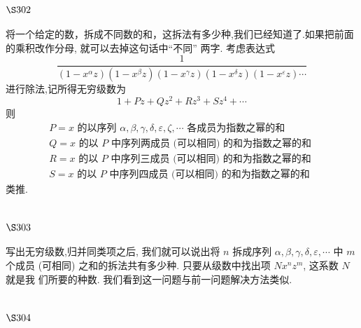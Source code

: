 \section{$\S 302$}

将一个给定的数，拆成不同数的和，这拆法有多少种,我们已经知道了.如果把前面的乘积改作分母, 就可以去掉这句话中“不同” 两字. 考虑表达式
\[
\frac{1}{\left(1-x^{\alpha} z\right)\left(1-x^{\beta} z\right)\left(1-x^{\gamma} z\right)\left(1-x^{\delta} z\right)\left(1-x^{\varepsilon} z\right) \cdots}
\]
进行除法,记所得无穷级数为
\[
1+P z+Q z^{2}+R z^{3}+S z^{4}+\cdots
\]
则
\[
\begin{gathered}
P=x \text { 的以序列 } \alpha, \beta, \gamma, \delta, \varepsilon, \zeta, \cdots \text { 各成员为指数之幂的和 } \\
Q=x \text { 的以 } P \text { 中序列两成员 (可以相同) 的和为指数之幂的和 } \\
R=x \text { 的以 } P \text { 中序列三成员 (可以相同) 的和为指数之幂的和 } \\
S=x \text { 的以 } P \text { 中序列四成员 (可以相同) 的和为指数之幂的和 }
\end{gathered}
\]
类推.

\section{$\S 303$}

写出无穷级数,归并同类项之后, 我们就可以说出将 $n$ 拆成序列 $\alpha, \beta, \gamma, \delta, \varepsilon, \cdots$ 中 $m$ 个成员 (可相同) 之和的拆法共有多少种. 只要从级数中找出项 $N x^{n} z^{m}$, 这系数 $N$ 就是我 们所要的种数. 我们看到这一问题与前一问题解决方法类似.

\section{$\S 304$}

